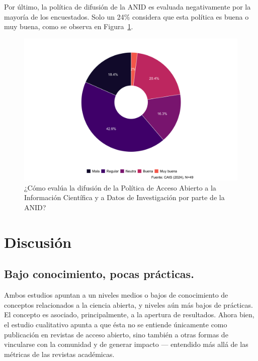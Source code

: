 \documentclass[
  letterpaper,
  DIV=11,
  numbers=noendperiod]{scrreprt}
\begin{document}
Por último, la política de difusión de la ANID es evaluada negativamente
por la mayoría de los encuestados. Solo un 24\% considera que esta
política es buena o muy buena, como se observa en
Figura~\ref{fig-vanid-2}.

\begin{figure}

{\centering \includegraphics{paper_files/figure-pdf/fig-vanid-2-1.png}

}

\caption{\label{fig-vanid-2}¿Cómo evalúa la difusión de la Política de
Acceso Abierto a la Información Científica y a Datos de Investigación
por parte de la ANID?}

\end{figure}

\hypertarget{discusiuxf3n}{%
\chapter{Discusión}\label{discusiuxf3n}}

\hypertarget{bajo-conocimiento-pocas-pruxe1cticas.}{%
\section{Bajo conocimiento, pocas
prácticas.}\label{bajo-conocimiento-pocas-pruxe1cticas.}}

Ambos estudios apuntan a un niveles medios o bajos de conocimiento de
conceptos relacionados a la ciencia abierta, y niveles aún más bajos de
prácticas. El concepto es asociado, principalmente, a la apertura de
resultados. Ahora bien, el estudio cualitativo apunta a que ésta no se
entiende únicamente como publicación en revistas de acceso abierto, sino
también a otras formas de vincularse con la comunidad y de generar
impacto --- entendido más allá de las métricas de las revistas
académicas.
\end{document}
